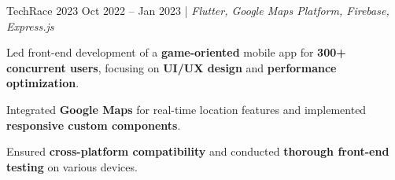 \resumeSubheadings
{TechRace 2023 }
{Oct 2022 -- Jan 2023}
{}{}{| \textit{Flutter, Google Maps Platform, Firebase, Express.js}}
\resumeItemListStart
\item Led front-end development of a \textbf{game-oriented} mobile app for \textbf{300+ concurrent users}, focusing on \textbf{UI/UX design} and \textbf{performance optimization}.
\item Integrated \textbf{Google Maps} for real-time location features and implemented \textbf{responsive custom components}.
\item Ensured \textbf{cross-platform compatibility} and conducted \textbf{thorough front-end testing} on various devices.
\resumeItemListEnd